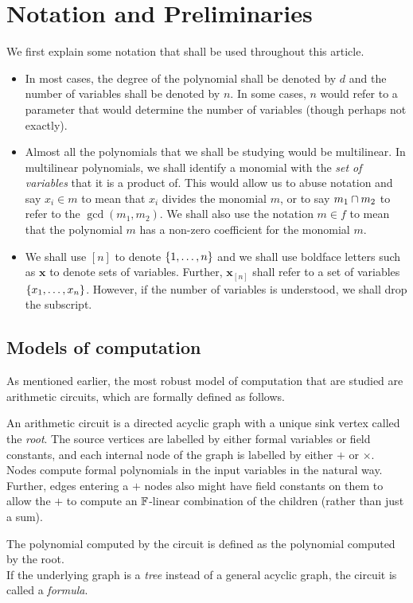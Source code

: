 \chapter{Notation and Preliminaries}\label{chap:notation}

We first explain some notation that shall be used throughout this article. 

\begin{itemize}
\item In most cases, the degree of the polynomial shall be denoted by $d$ and the number of variables shall be denoted by $n$. In some cases, $n$ would refer to a parameter that would determine the number of variables (though perhaps not exactly). 
\item Almost all the polynomials that we shall be studying would be multilinear. In multilinear polynomials, we shall identify a monomial with the \emph{set of variables} that it is a product of. This would allow us to abuse notation and say $x_i \in m$ to mean that $x_i$ divides the monomial $m$, or to say $m_1 \cap m_2$ to refer to the $\gcd(m_1,m_2)$. We shall also use the notation $m \in f$ to mean that the polynomial $m$ has a non-zero coefficient for the monomial $m$. 
\item We shall use $[n]$ to denote $\left\{1,\dots, n\right\}$ and we shall use boldface letters such as $\mathbf{x}$ to denote sets of variables. Further, $\mathbf{x}_{[n]}$ shall refer to a set of variables $\left\{x_1,\dots, x_n\right\}$. However, if the number of variables is understood, we shall drop the subscript. 
\end{itemize}


\section{Models of computation}

As mentioned earlier, the most robust model of computation that are studied are arithmetic circuits, which are formally defined as follows. 

\begin{definition}\label{defn:arithmetic-circuit}
An arithmetic circuit is a directed acyclic graph with a unique sink vertex called the \emph{root}. The source vertices are labelled by either formal variables or field constants, and each internal node of the graph is labelled by either $+$ or $\times$. Nodes compute formal polynomials in the input variables  in the natural way. Further, edges entering a $+$ nodes also might have field constants on them to allow the $+$ to compute an $\mathbb{F}$-linear combination of the children (rather than just a sum). 

The polynomial computed by the circuit is defined as the polynomial computed by the root. \\

\noindent
If the underlying graph is a \emph{tree} instead of a general acyclic graph, the circuit is called a \emph{formula}.
\end{definition}


